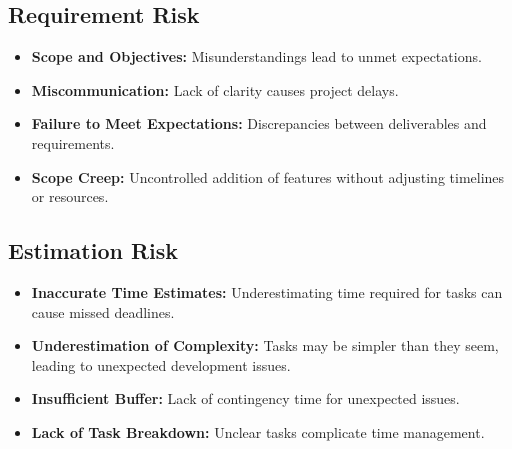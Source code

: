 \documentclass{article}
\begin{document}
\vspace{0.5cm}

\subsection{Requirement Risk}
\begin{itemize}
    \item \textbf{Scope and Objectives:} Misunderstandings lead to unmet expectations.
    \item \textbf{Miscommunication:} Lack of clarity causes project delays.
    \item \textbf{Failure to Meet Expectations:} Discrepancies between deliverables and requirements.
    \item \textbf{Scope Creep:} Uncontrolled addition of features without adjusting timelines or resources.
\end{itemize}

\vspace{0.5cm}

\subsection{Estimation Risk}
\begin{itemize}
    \item \textbf{Inaccurate Time Estimates:} Underestimating time required for tasks can cause missed deadlines.
    \item \textbf{Underestimation of Complexity:} Tasks may be simpler than they seem, leading to unexpected development issues.
    \item \textbf{Insufficient Buffer:} Lack of contingency time for unexpected issues.
    \item \textbf{Lack of Task Breakdown:} Unclear tasks complicate time management.
\end{itemize}

\vspace{0.5cm}
\end{document}
